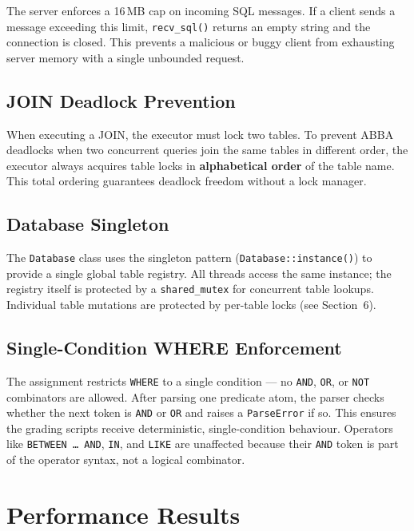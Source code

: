 \documentclass[12pt,a4paper]{article}
\begin{document}
The server enforces a 16\,MB cap on incoming SQL messages. If a client sends a message
exceeding this limit, \texttt{recv\_sql()} returns an empty string and the connection is
closed. This prevents a malicious or buggy client from exhausting server memory with a
single unbounded request.

\subsection{JOIN Deadlock Prevention}

When executing a JOIN, the executor must lock two tables. To prevent ABBA deadlocks when
two concurrent queries join the same tables in different order, the executor always
acquires table locks in \textbf{alphabetical order} of the table name. This total ordering
guarantees deadlock freedom without a lock manager.

\subsection{Database Singleton}

The \texttt{Database} class uses the singleton pattern (\texttt{Database::instance()}) to
provide a single global table registry. All threads access the same instance; the registry
itself is protected by a \texttt{shared\_mutex} for concurrent table lookups. Individual
table mutations are protected by per-table locks (see Section~6).

\subsection{Single-Condition WHERE Enforcement}

The assignment restricts \texttt{WHERE} to a single condition --- no \texttt{AND},
\texttt{OR}, or \texttt{NOT} combinators are allowed. After parsing one predicate atom,
the parser checks whether the next token is \texttt{AND} or \texttt{OR} and raises a
\texttt{ParseError} if so. This ensures the grading scripts receive deterministic,
single-condition behaviour. Operators like \texttt{BETWEEN \ldots\ AND}, \texttt{IN},
and \texttt{LIKE} are unaffected because their \texttt{AND} token is part of the
operator syntax, not a logical combinator.

\section{Performance Results}
\end{document}
